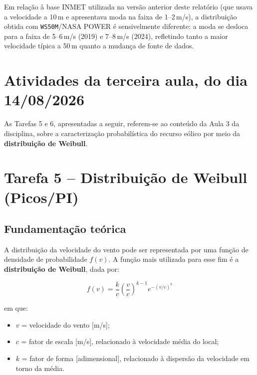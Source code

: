 \documentclass[11pt,a4paper]{article}
\begin{document}
\noindent Em relação à base INMET utilizada na versão anterior deste
relatório (que usava a velocidade a 10\,m e apresentava moda na faixa de
1--2\,m/s), a distribuição obtida com \texttt{WS50M}/NASA POWER é
sensivelmente diferente: a moda se desloca para a faixa de 5--6\,m/s (2019)
e 7--8\,m/s (2024), refletindo tanto a maior velocidade típica a 50\,m
quanto a mudança de fonte de dados.

\newpage
\section{Atividades da terceira aula, do dia 14/08/2026}

As Tarefas 5 e 6, apresentadas a seguir, referem-se ao conteúdo da Aula 3
da disciplina, sobre a caracterização probabilística do recurso eólico por
meio da \textbf{distribuição de Weibull}.

\section{Tarefa 5 -- Distribuição de Weibull (Picos/PI)}

\subsection{Fundamentação teórica}

A distribuição da velocidade do vento pode ser representada por uma função
de densidade de probabilidade $f(v)$. A função mais utilizada para esse
fim é a \textbf{distribuição de Weibull}, dada por:

\begin{equation}
    f(v) = \frac{k}{c}\left(\frac{v}{c}\right)^{k-1} e^{-(v/c)^k}
    \label{eq:weibull}
\end{equation}

em que:
\begin{itemize}
    \item $v$ = velocidade do vento [m/s];
    \item $c$ = fator de escala [m/s], relacionado à velocidade média do local;
    \item $k$ = fator de forma [adimensional], relacionado à dispersão da
    velocidade em torno da média.
\end{itemize}
\end{document}
